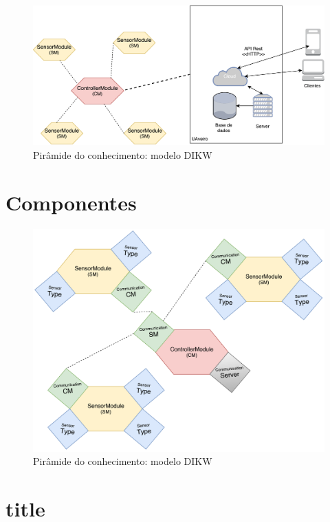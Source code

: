 \begin{figure}[!htb]
	\centering
	\includegraphics[scale=0.55]{esquemas/arquitetura_geral.pdf}
	\caption{Pirâmide do conhecimento: modelo DIKW}
	\label{dikw}
\end{figure}


\newpage


\section{Componentes}


\begin{figure}[!htb]
	\centering
	\includegraphics[scale=0.55]{esquemas/general-electronic-modules.pdf}
	\caption{Pirâmide do conhecimento: modelo DIKW}
	\label{dikw}
\end{figure}


\section{title}